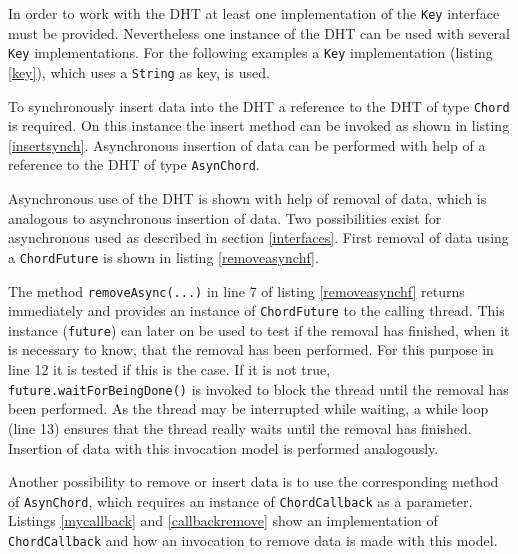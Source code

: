 In order to work with the DHT at least one implementation of the {\tt Key} 
interface must be provided. Nevertheless one instance of the DHT can be used 
with several {\tt Key} implementations. For the following examples a {\tt Key}
implementation (listing \ref{key}), which uses a {\tt String} as key, is used.


To synchronously insert data into the DHT a reference to the DHT of type 
{\tt Chord} is required. On this instance the insert method can be invoked 
as shown in listing \ref{insertsynch}. Asynchronous insertion of data 
can be performed with help of a reference to the DHT of type {\tt AsynChord}. 


Asynchronous use of the DHT is shown with help of removal of data, which is 
analogous to asynchronous insertion of data. Two possibilities exist for 
asynchronous used as described in section \ref{interfaces}. First removal of 
data using a {\tt ChordFuture} is shown in listing \ref{removeasynchf}. 


The method {\tt removeAsync(...)} in line 7 of listing \ref{removeasynchf} returns 
immediately and provides an instance of {\tt ChordFuture} to the calling thread. 
This instance ({\tt future}) can later on be used to test if the removal has finished, when it is necessary to know, that the removal has been performed. For this 
purpose in line 12 it is tested if this is the case. If it is not true, 
{\tt future.waitForBeingDone()} is invoked to block the thread until the removal 
has been performed. As the thread may be interrupted while waiting, a while loop 
(line 13) ensures that the thread really waits until the removal has finished. 
Insertion of data with this invocation model is performed analogously. 

Another possibility to remove or insert data is to use the corresponding method 
of {\tt AsynChord}, which requires an instance of {\tt ChordCallback} as 
a parameter. Listings \ref{mycallback} and \ref{callbackremove} show an 
implementation of {\tt ChordCallback} and how an invocation to 
remove data is made with this model. 


